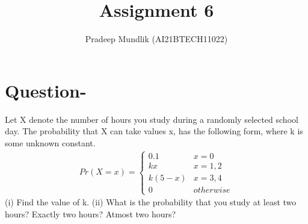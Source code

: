 \documentclass[journal,12pt,twocolumn]{IEEEtran}
\begin{document}
\makeatletter
{}
\makeatother
\let\StandardTheFigure\thefigure{}
\let\vec\mathbf{}
\renewcommand{\thefigure}{\theproblem}
\def\putbox#1#2#3{\makebox[0in][l]{\makebox[#1][l]{}\raisebox{\baselineskip}[0in][0in]{\raisebox{#2}[0in][0in]{#3}}}}
\def\rightbox#1{\makebox[0in][r]{#1}}
\def\centbox#1{\makebox[0in]{#1}}
\def\topbox#1{\raisebox{-\baselineskip}[0in][0in]{#1}}
\def\midbox#1{\raisebox{-0.5\baselineskip}[0in][0in]{#1}}
\vspace{3cm}
\title{Assignment 6}
\author{Pradeep Mundlik (AI21BTECH11022)}
\maketitle
\section{Question-}
       Let X denote the number of hours you study during a randomly selected
       school day. The probability that X can take values x, has the following form, where
       k is some unknown constant. \\
    \begin{align}
        Pr(X = x) = 
        \begin{cases}
            0.1 & x = 0 \\
            kx & x = 1,2 \\
            k\left(5-x\right) & x = 3,4 \\
            0 & otherwise
        \end{cases}
    \end{align}
    (i) Find the value of k.
    (ii) What is the probability that you study at least two hours? Exactly two hours?
    Atmost two hours?       
\end{document}
